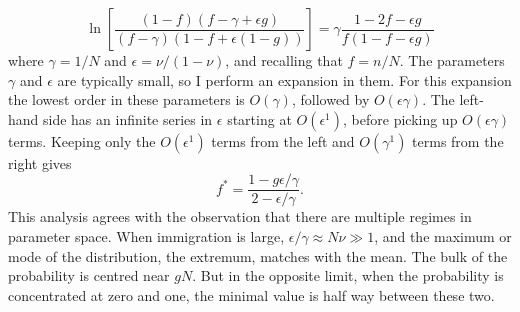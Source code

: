 \fi
\begin{equation}
\ln\left[ \frac{(1-f)(f-\gamma+\epsilon g)}{(f-\gamma)(1-f+\epsilon(1-g))}\right] = \gamma\frac{1-2f-\epsilon g}{f\left(1-f-\epsilon g\right)}
\end{equation}
where $\gamma = 1/N$ and $\epsilon = \nu/(1-\nu)$, and recalling that $f=n/N$. 
The parameters $\gamma$ and $\epsilon$ are typically small, so I perform an expansion in them. 
For this expansion the lowest order in these parameters is $O(\gamma)$, followed by $O(\epsilon\gamma)$. 
The left-hand side has an infinite series in $\epsilon$ starting at $O(\epsilon^1)$, before picking up $O(\epsilon\gamma)$ terms. 
Keeping only the $O(\epsilon^1)$ terms from the left and $O(\gamma^1)$ terms from the right gives
\begin{equation}
	f^* = \frac{1-g\epsilon/\gamma}{2-\epsilon/\gamma}. %
\end{equation}
This analysis agrees with the observation that there are multiple regimes in parameter space. 
When immigration is large, $\epsilon/\gamma \approx N\nu \gg 1$, and the maximum or mode of the distribution, the extremum, matches with the mean. 
The bulk of the probability is centred near $g N$. 
But in the opposite limit, when the probability is concentrated at zero and one, the minimal value is half way between these two. 

